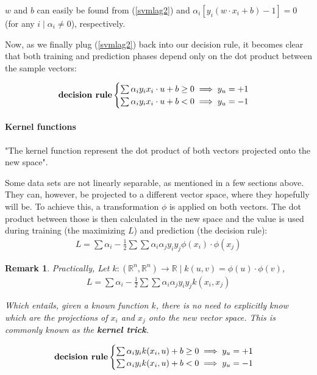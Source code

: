 \documentclass[12pt]{article}
\newtheorem{remark}{Remark}[section]
\begin{document}
$w$ and $b$ can easily be found from (\ref{svmlag2}) and $\alpha_i[y_i(w \cdot x_i + b) - 1] = 0$ (for any $i \mid \alpha_i \ne 0$), respectively.

Now, as we finally plug (\ref{svmlag2}) back into our decision rule, it becomes clear that both training and prediction phases depend only on the dot product between the sample vectors: \cite{mitsvm}

$$\text{\textbf{decision rule}} \begin{cases}
	\sum\alpha_i y_i x_i \cdot u +b \geq 0 \implies y_u=+1\\
	\sum\alpha_i y_i x_i \cdot u +b < 0 \implies y_u=-1\\
\end{cases}$$

\paragraph{Kernel functions}

"The kernel function represent the dot product of both vectors projected onto the new space". \cite{mitsvm}

Some data sets are not linearly separable, as mentioned in a few sections above. They can, however, be projected to a different vector space, where they hopefully will be. To achieve this, a transformation $\phi$ is applied on both vectors. The dot product between those is then calculated in the new space and the value is used during training (the maximizing $L$) and prediction (the decision rule):
\begin{gather*}
L = \sum\alpha_i -\frac{1}{2}\sum\sum\alpha_i\alpha_j y_i y_j \phi(x_i) \cdot \phi(x_j)
\end{gather*}

\begin{remark}
	Practically, Let $k: (\mathbb{R}^n, \mathbb{R}^n) \rightarrow \mathbb{R} \mid k(u, v) = \phi(u) \cdot \phi(v)$,
	\begin{gather*}
	L = \sum\alpha_i -\frac{1}{2}\sum\sum\alpha_i\alpha_j y_i y_j k(x_i, x_j)
	\end{gather*}
	
	Which entails, given a known function $k$, there is no need to explicitly know which are the projections of $x_i$ and $x_j$ onto the new vector space. This is commonly known as the \textbf{kernel trick}.
\end{remark}

$$\text{\textbf{decision rule}} \begin{cases}
\sum\alpha_i y_i k(x_i, u) +b \geq 0 \implies y_u=+1\\
\sum\alpha_i y_i k(x_i, u) +b < 0 \implies y_u=-1\\
\end{cases}$$
\end{document}
